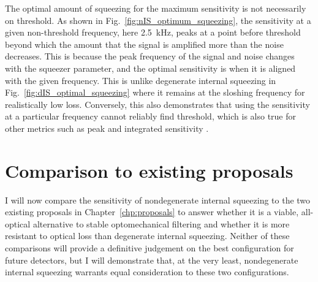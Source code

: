 
The optimal amount of squeezing for the maximum sensitivity is not necessarily on threshold. As shown in Fig.~\ref{fig:nIS_optimum_squeezing}, the sensitivity at a given non-threshold frequency, here 2.5~kHz, peaks at a point before threshold beyond which the amount that the signal is amplified more than the noise decreases.
This is because the peak frequency of the signal and noise changes with the squeezer parameter, and the optimal sensitivity is when it is aligned with the given frequency. This is unlike degenerate internal squeezing in Fig.~\ref{fig:dIS_optimal_squeezing} where it remains at the sloshing frequency for realistically low loss. 
Conversely, this also demonstrates that using the sensitivity at a particular frequency cannot reliably find threshold, which is also true for other metrics such as peak and integrated sensitivity . %


\section{Comparison to existing proposals}

I will now compare the sensitivity of nondegenerate internal squeezing to the two existing proposals in Chapter~\ref{chp:proposals} to answer whether it is a viable, all-optical alternative to stable optomechanical filtering and whether it is more resistant to optical loss than degenerate internal squeezing. Neither of these comparisons will provide a definitive judgement on the best configuration for future detectors, but I will demonstrate that, at the very least, nondegenerate internal squeezing warrants equal consideration to these two configurations.

